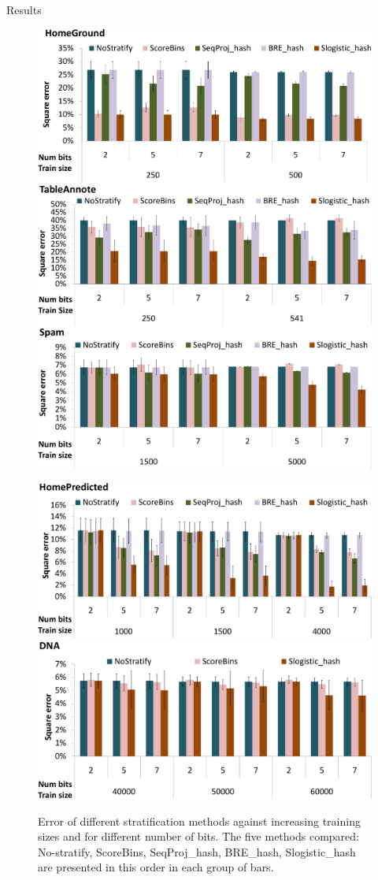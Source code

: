 \documentclass[11pt]{beamer}
\begin{document}
\begin{frame}[allowframebreaks]{Results}
\begin{center}
\begin{figure}
\includegraphics[width=0.36\hsize, height=.25\vsize]{figs/e2homeground_crop}
\includegraphics[width=0.36\hsize, height=.25\vsize]{figs/e2tableannote_crop}
\includegraphics[width=0.36\hsize, height=.25\vsize]{figs/e2spam_crop}
\end{figure}
\begin{figure}
\includegraphics[width=0.42\hsize, height=.25\vsize]{figs/e2homepredicted_crop}
\includegraphics[width=0.42\hsize, height=.25\vsize]{figs/e2dna_crop}
\caption{Error of different stratification methods against increasing
  training sizes and for different number of bits. The five methods
  compared: No-stratify, ScoreBins, SeqProj\_hash, BRE\_hash,
  Slogistic\_hash are presented in this order in each group of
  bars.}
\end{figure}
\end{center}

\framebreak


\end{frame}
\end{document}
